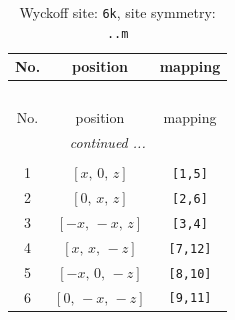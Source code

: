 \documentclass[fleqn,8pt]{jsarticle}
\begin{document}
\renewcommand{\arraystretch}{1.2}
\begin{longtable}{ccc}
\caption{Wyckoff site: {\tt 6k}, site symmetry: {\tt ..m}}
 \\
 \hline \hline
No. & position & mapping \\ \hline \endfirsthead

\multicolumn{2}{l}{\tablename\ \thetable{}} \\
 \hline \hline
No. & position & mapping \\ \hline \endhead

 \hline \hline
\multicolumn{2}{r}{\footnotesize\it continued ...} \\ \endfoot

 \hline \hline
\multicolumn{2}{r}{} \\ \endlastfoot

1 & $\left[ x,\, 0,\, z \right]$ & {\tt [1,5]} \\ \hline
2 & $\left[ 0,\, x,\, z \right]$ & {\tt [2,6]} \\ \hline
3 & $\left[ - x,\, - x,\, z \right]$ & {\tt [3,4]} \\ \hline
4 & $\left[ x,\, x,\, - z \right]$ & {\tt [7,12]} \\ \hline
5 & $\left[ - x,\, 0,\, - z \right]$ & {\tt [8,10]} \\ \hline
6 & $\left[ 0,\, - x,\, - z \right]$ & {\tt [9,11]} \\
\end{longtable}
\renewcommand{\arraystretch}{1.2}
\end{document}
